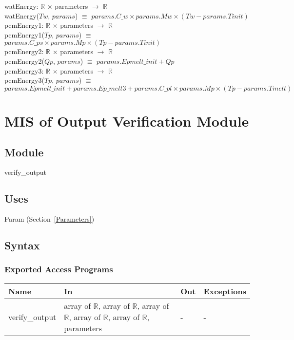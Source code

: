 \documentclass[12pt]{article}
\begin{document}
watEnergy: $\mathbb{R}$ $\times$ parameters $\rightarrow$ $\mathbb{R}$ \\
watEnergy($Tw$, $params$) $\equiv$ $params.C\_w \times params.Mw \times (Tw - params.Tinit)$ \\
\newline
pcmEnergy1: $\mathbb{R}$ $\times$ parameters $\rightarrow$ $\mathbb{R}$ \\
pcmEnergy1($Tp$, $params$) $\equiv$ $params.C\_ps \times params.Mp \times (Tp - params.Tinit)$ \\
\newline
pcmEnergy2: $\mathbb{R}$ $\times$ parameters $\rightarrow$ $\mathbb{R}$ \\
pcmEnergy2($Qp$, $params$) $\equiv$ $params.Epmelt\_init + Qp$ \\
\newline
pcmEnergy3: $\mathbb{R}$ $\times$ parameters $\rightarrow$ $\mathbb{R}$ \\
pcmEnergy3($Tp$, $params$) $\equiv$ $params.Epmelt\_init + params.Ep\_melt3 + params.C\_pl \times params.Mp \times (Tp - params.Tmelt)$ \\

\newpage
\section{MIS of Output Verification Module} \label{VerifyOutput}

\subsection{Module}

verify\_output

\subsection{Uses}

Param (Section~\ref{Parameters})

\subsection{Syntax}

\subsubsection{Exported Access Programs}

\begin{center}
\begin{tabular}{p{3cm} p{7cm} p{2cm} p{2cm}}
\hline
\textbf{Name} & \textbf{In} & \textbf{Out} & \textbf{Exceptions} \\
\hline
verify\_output & array of $\mathbb{R}$, array of $\mathbb{R}$, array of $\mathbb{R}$, array of $\mathbb{R}$, array of $\mathbb{R}$, parameters & - & - \\
\hline
\end{tabular}
\end{center}
\end{document}
